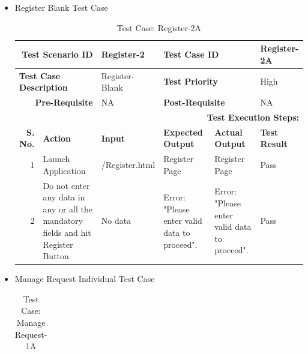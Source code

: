 \documentclass[a4paper, hidelinks, 12pt]{report}
\begin{document}
\begin{itemize}
\begin{table}[H]
\begin{tabular}{|r|p{4.355em}|p{7.715em}|p{6.43em}|p{5.855em}|p{5.07em}|}
    \bottomrule
    \end{tabular}%
  \label{tab:Test Case: Register-1B}%
\end{table}%
\item{Register Blank Test Case}
\begin{table}[H]
  \centering
  \caption{Test Case: Register-2A}
    \begin{tabular}{|r|p{4.355em}|p{7.715em}|p{6.43em}|p{5.855em}|p{5.07em}|}
    \toprule
    \multicolumn{2}{|p{13.425em}|}{\textbf{Test Scenario ID}} & Register-2 & \multicolumn{2}{p{12.285em}|}{\textbf{Test Case ID}} & Register-2A \\
    \midrule
    \multicolumn{2}{|l|}{\multirow{2}[2]{*}{\textbf{Test Case Description}}} & \multirow{2}[2]{*}{Register-Blank} & \multicolumn{2}{l|}{\multirow{2}[2]{*}{\textbf{Test Priority}}} & \multirow{2}[2]{*}{High} \\
    \multicolumn{2}{|l|}{} & \multicolumn{1}{l|}{} & \multicolumn{2}{l|}{} & \multicolumn{1}{l|}{} \\
    \midrule
    \multicolumn{2}{|p{13.425em}|}{\textbf{Pre-Requisite}} & NA    & \multicolumn{2}{p{12.285em}|}{\textbf{Post-Requisite}} & NA \\
    \midrule
    \multicolumn{6}{p{38.495em}|}{\textbf{Test Execution Steps:}} \\
    \midrule
    \multicolumn{1}{|p{5.07em}|}{\textbf{S. No.}} & \textbf{Action } & \textbf{Input} & \textbf{Expected Output} & \textbf{Actual Output} & \textbf{Test Result} \\
    \midrule
    1     & Launch Application & \textcolor[rgb]{ .02,  .388,  .757}{/Register.html} & Register Page & Register Page & Pass \\
    \midrule
    2     & Do not enter any data in any or all the mandatory fields and hit Register Button & No data & Error: "Please enter valid data to proceed". & Error: "Please enter valid data to proceed". & Pass \\
    \bottomrule
    \end{tabular}%
  \label{tab:Test Case: Register-2A}%
\end{table}%
\item{Manage Request Individual Test Case}
\begin{table}[H]
  \centering
  \caption{Test Case: Manage Request-1A}
    \begin{tabular}{|r|p{4.355em}|p{7.715em}|p{6.43em}|p{5.855em}|p{5.07em}|}

\end{tabular}
\end{table}
\end{itemize}
\end{document}

